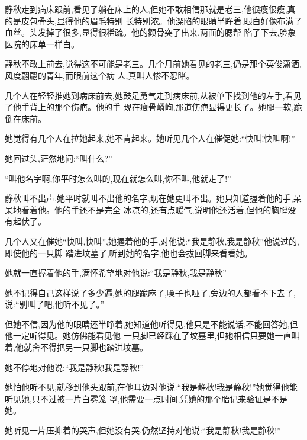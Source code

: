 ﻿\documentclass[12pt]{article}
\begin{document}
静秋走到病床跟前,看见了躺在床上的人,但她不敢相信那就是老三,他很瘦很瘦,真的是皮包骨头,显得他的眉毛特别
长特别浓。他深陷的眼睛半睁着,眼白好像布满了血丝。头发掉了很多,显得很稀疏。他的颧骨突了出来,两面的腮帮
陷了下去,脸象医院的床单一样白。



静秋不敢上前去,觉得这不可能是老三。几个月前她看见的老三,仍是那个英俊潇洒,风度翩翩的青年,而眼前这个病
人,真叫人惨不忍睹。



几个人在轻轻推她到病床前去,她鼓足勇气走到病床前,从被单下找到他的左手,看见了他手背上的那个伤疤。他的手
现在瘦骨嶙峋,那道伤疤显得更长了。她腿一软,跪倒在床前。



她觉得有几个人在拉她起来,她不肯起来。她听见几个人在催促她:``快叫!快叫啊!''



她回过头,茫然地问:``叫什么?''



``叫他名字啊,你平时怎么叫的,现在就怎么叫,你不叫,他就走了!''



静秋叫不出声,她平时就叫不出他的名字,现在她更叫不出。她只知道握着他的手,呆呆地看着他。他的手还不是完全
冰凉的,还有点暖气,说明他还活着,但他的胸膛没有起伏了。



几个人又在催她``快叫,快叫'',她握着他的手,对他说:``我是静秋,我是静秋\myrule ''他说过的,即使他的一只脚
踏进坟墓了,听到她的名字,他也会拔回脚来看看她。



她就一直握着他的手,满怀希望地对他说:``我是静秋,我是静秋\myrule ''



她不记得自己这样说了多少遍,她的腿跪麻了,嗓子也哑了,旁边的人都看不下去了,说:``别叫了吧,他听不见了。''



但她不信,因为他的眼睛还半睁着,她知道他听得见,他只是不能说话,不能回答她,但他一定听得见。她仿佛能看见他
一只脚已经踩在了坟墓里,但她相信只要她一直叫着,他就舍不得把另一只脚也踏进坟墓。



她不停地对他说:``我是静秋!我是静秋!''



她怕他听不见,就移到他头跟前,在他耳边对他说:``我是静秋!我是静秋!''她觉得他能听见她,只不过被一片白雾笼
罩,他需要一点时间,凭她的那个胎记来验证是不是她。



她听见一片压抑着的哭声,但她没有哭,仍然坚持对他说:``我是静秋!我是静秋!''
\end{document}
